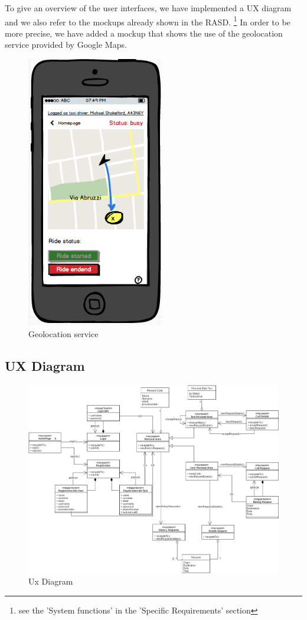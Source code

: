 To give an overview of the user interfaces, we have implemented a UX diagram and we also refer to the mockups already shown in the RASD.
\footnote{see the 'System functions' in the 'Specific Requirements' section}
\newline
In order to be more precise, we have added a mockup that shows the use of the geolocation service provided by Google Maps.    
\newline
\begin{figure}[H]
    \centering
    \includegraphics[width=6cm]{./Images/GoogleMaps.png}
    \caption{Geolocation service}
\end{figure}

\newpage
\subsection{UX Diagram}
    \begin{figure}[H]
        \centering
        \includegraphics[width=17cm, angle=90]{./Images/UX_Diagram.png}
        \caption{Ux Diagram}
    \end{figure}
